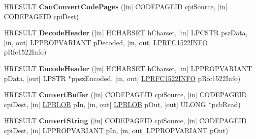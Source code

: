 \begin{DoxyCompactItemize}
\item 
\mbox{\label{interface_m_i_m_e_o_l_e_1_1_i_mime_international_a0166ce13ba4fda407174c0c50dbbdf13}} 
H\+R\+E\+S\+U\+LT {\bfseries Can\+Convert\+Code\+Pages} (\mbox{[}in\mbox{]} C\+O\+D\+E\+P\+A\+G\+E\+ID cpi\+Source, \mbox{[}in\mbox{]} C\+O\+D\+E\+P\+A\+G\+E\+ID cpi\+Dest)
\item 
\mbox{\label{interface_m_i_m_e_o_l_e_1_1_i_mime_international_a87881248fc012ab613fb27c9c88cf505}} 
H\+R\+E\+S\+U\+LT {\bfseries Decode\+Header} (\mbox{[}in\mbox{]} H\+C\+H\+A\+R\+S\+ET h\+Charset, \mbox{[}in\mbox{]} L\+P\+C\+S\+TR psz\+Data, \mbox{[}in, out\mbox{]} L\+P\+P\+R\+O\+P\+V\+A\+R\+I\+A\+NT p\+Decoded, \mbox{[}in, out\mbox{]} \hyperlink{struct_m_i_m_e_o_l_e_1_1_i_mime_international_1_1tag_r_f_c1522_i_n_f_o}{L\+P\+R\+F\+C1522\+I\+N\+FO} p\+Rfc1522\+Info)
\item 
\mbox{\label{interface_m_i_m_e_o_l_e_1_1_i_mime_international_a616f8f7853f400f53e0108c7a94ad973}} 
H\+R\+E\+S\+U\+LT {\bfseries Encode\+Header} (\mbox{[}in\mbox{]} H\+C\+H\+A\+R\+S\+ET h\+Charset, \mbox{[}in\mbox{]} L\+P\+P\+R\+O\+P\+V\+A\+R\+I\+A\+NT p\+Data, \mbox{[}out\mbox{]} L\+P\+S\+TR $\ast$ppsz\+Encoded, \mbox{[}in, out\mbox{]} \hyperlink{struct_m_i_m_e_o_l_e_1_1_i_mime_international_1_1tag_r_f_c1522_i_n_f_o}{L\+P\+R\+F\+C1522\+I\+N\+FO} p\+Rfc1522\+Info)
\item 
\mbox{\label{interface_m_i_m_e_o_l_e_1_1_i_mime_international_a05559cfa1b18631f71e85fac75b18505}} 
H\+R\+E\+S\+U\+LT {\bfseries Convert\+Buffer} (\mbox{[}in\mbox{]} C\+O\+D\+E\+P\+A\+G\+E\+ID cpi\+Source, \mbox{[}in\mbox{]} C\+O\+D\+E\+P\+A\+G\+E\+ID cpi\+Dest, \mbox{[}in\mbox{]} \hyperlink{struct___b_l_o_b}{L\+P\+B\+L\+OB} p\+In, \mbox{[}in, out\mbox{]} \hyperlink{struct___b_l_o_b}{L\+P\+B\+L\+OB} p\+Out, \mbox{[}out\mbox{]} U\+L\+O\+NG $\ast$pcb\+Read)
\item 
\mbox{\label{interface_m_i_m_e_o_l_e_1_1_i_mime_international_a6900ab4884b2314daf549d7914c449fd}} 
H\+R\+E\+S\+U\+LT {\bfseries Convert\+String} (\mbox{[}in\mbox{]} C\+O\+D\+E\+P\+A\+G\+E\+ID cpi\+Source, \mbox{[}in\mbox{]} C\+O\+D\+E\+P\+A\+G\+E\+ID cpi\+Dest, \mbox{[}in\mbox{]} L\+P\+P\+R\+O\+P\+V\+A\+R\+I\+A\+NT p\+In, \mbox{[}in, out\mbox{]} L\+P\+P\+R\+O\+P\+V\+A\+R\+I\+A\+NT p\+Out)

\end{DoxyCompactItemize}
